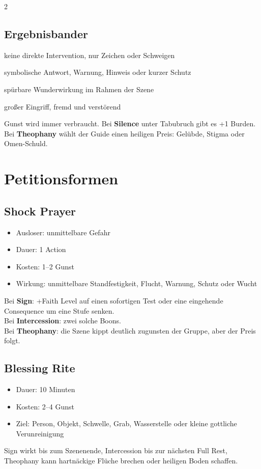 \begin{multicols*}{2}
\subsection{Ergebnisbander}
\begin{description}[style=nextline,leftmargin=0pt]
\item[\textbf{1--7 Silence}] keine direkte Intervention, nur Zeichen oder Schweigen
\item[\textbf{8--11 Sign}] symbolische Antwort, Warnung, Hinweis oder kurzer Schutz
\item[\textbf{12--15 Intercession}] spürbare Wunderwirkung im Rahmen der Szene
\item[\textbf{16+ Theophany}] großer Eingriff, fremd und verstörend
\end{description}

Gunst wird immer verbraucht. Bei \textbf{Silence} unter Tabubruch gibt es +1 Burden. Bei \textbf{Theophany} wählt der Guide einen heiligen Preis: Gelübde, Stigma oder Omen-Schuld.

\section{Petitionsformen}
\subsection{Shock Prayer}
\begin{itemize}[leftmargin=*]
\item Ausloser: unmittelbare Gefahr
\item Dauer: 1 Action
\item Kosten: 1--2 Gunst
\item Wirkung: unmittelbare Standfestigkeit, Flucht, Warnung, Schutz oder Wucht
\end{itemize}
Bei \textbf{Sign}: +Faith Level auf einen sofortigen Test oder eine eingehende Consequence um eine Stufe senken.\\
Bei \textbf{Intercession}: zwei solche Boons.\\
Bei \textbf{Theophany}: die Szene kippt deutlich zugunsten der Gruppe, aber der Preis folgt.

\subsection{Blessing Rite}
\begin{itemize}[leftmargin=*]
\item Dauer: 10 Minuten
\item Kosten: 2--4 Gunst
\item Ziel: Person, Objekt, Schwelle, Grab, Wasserstelle oder kleine gottliche Verunreinigung
\end{itemize}
Sign wirkt bis zum Szenenende, Intercession bis zur nächsten Full Rest, Theophany kann hartnäckige Flüche brechen oder heiligen Boden schaffen.


\end{multicols*}
